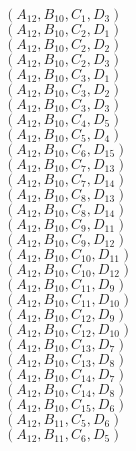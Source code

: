 \documentclass[14pt]{article}
\begin{document}
    $({A}_{12}, {B}_{10}, {C}_{1}, {D}_{3}) $ \\ 
    $({A}_{12}, {B}_{10}, {C}_{2}, {D}_{1}) $ \\ 
    $({A}_{12}, {B}_{10}, {C}_{2}, {D}_{2}) $ \\ 
    $({A}_{12}, {B}_{10}, {C}_{2}, {D}_{3}) $ \\ 
    $({A}_{12}, {B}_{10}, {C}_{3}, {D}_{1}) $ \\ 
    $({A}_{12}, {B}_{10}, {C}_{3}, {D}_{2}) $ \\ 
    $({A}_{12}, {B}_{10}, {C}_{3}, {D}_{3}) $ \\ 
    $({A}_{12}, {B}_{10}, {C}_{4}, {D}_{5}) $ \\ 
    $({A}_{12}, {B}_{10}, {C}_{5}, {D}_{4}) $ \\ 
    $({A}_{12}, {B}_{10}, {C}_{6}, {D}_{15}) $ \\ 
    $({A}_{12}, {B}_{10}, {C}_{7}, {D}_{13}) $ \\ 
    $({A}_{12}, {B}_{10}, {C}_{7}, {D}_{14}) $ \\ 
    $({A}_{12}, {B}_{10}, {C}_{8}, {D}_{13}) $ \\ 
    $({A}_{12}, {B}_{10}, {C}_{8}, {D}_{14}) $ \\ 
    $({A}_{12}, {B}_{10}, {C}_{9}, {D}_{11}) $ \\ 
    $({A}_{12}, {B}_{10}, {C}_{9}, {D}_{12}) $ \\ 
    $({A}_{12}, {B}_{10}, {C}_{10}, {D}_{11}) $ \\ 
    $({A}_{12}, {B}_{10}, {C}_{10}, {D}_{12}) $ \\ 
    $({A}_{12}, {B}_{10}, {C}_{11}, {D}_{9}) $ \\ 
    $({A}_{12}, {B}_{10}, {C}_{11}, {D}_{10}) $ \\ 
    $({A}_{12}, {B}_{10}, {C}_{12}, {D}_{9}) $ \\ 
    $({A}_{12}, {B}_{10}, {C}_{12}, {D}_{10}) $ \\ 
    $({A}_{12}, {B}_{10}, {C}_{13}, {D}_{7}) $ \\ 
    $({A}_{12}, {B}_{10}, {C}_{13}, {D}_{8}) $ \\ 
    $({A}_{12}, {B}_{10}, {C}_{14}, {D}_{7}) $ \\ 
    $({A}_{12}, {B}_{10}, {C}_{14}, {D}_{8}) $ \\ 
    $({A}_{12}, {B}_{10}, {C}_{15}, {D}_{6}) $ \\ 
    $({A}_{12}, {B}_{11}, {C}_{5}, {D}_{6}) $ \\ 
    $({A}_{12}, {B}_{11}, {C}_{6}, {D}_{5}) $ \\ 
\end{document}
